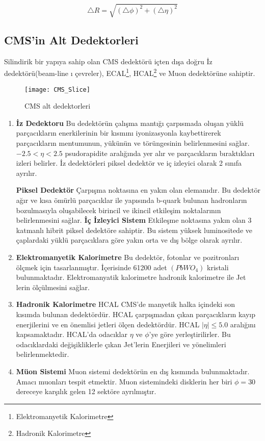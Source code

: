 \begin{equation}
\triangle R = \sqrt{(\triangle \phi)^2 + (\triangle  \eta)^2}
\label{eq:daltar}
\end{equation}


\subsection{CMS'in Alt Dedektorleri}

Silindirik bir yapıya sahip olan CMS dedektörü içten dışa doğru İz	dedektörü(beam-line ı çevreler), ECAL\footnote{Elektromanyetik Kalorimetre}, HCAL\footnote{Hadronik Kalorimetre} ve Muon dedektörüne sahiptir.
\begin{figure}[!htbp]
\begin{center}
\texttt{[image: CMS\_Slice]}
\caption{CMS alt dedektorleri}
\end{center}
\end{figure}
\begin{enumerate}


\item \textbf{İz Dedektoru}
Bu dedektörün çalışma mantığı çarpısmada oluşan yüklü parçacıkların enerkilerinin bir kısmını iyonizasyonla kaybettirerek parçacıkların mentumunun, yükünün ve törüngesinin belirlenmesini sağlar.$-2.5 < \eta < 2.5 $ psudorapidite aralığında yer alır ve parçacıkların bıraktıkları izleri belirler. İz dedektörleri piksel dedektör ve iç izleyici olarak 2 sınıfa ayrılır. 

\textbf{Piksel Dedektör}
Çarpışma noktasına en yakın olan elemanıdır. Bu dedektör ağır ve kısa ömürlü parçacıklar ile yapısında b-quark bulunan hadronların bozulmasıyla oluşabilecek birincil ve ikincil etkileşim noktalarının belirlenmesini sağlar.
\textbf{İç İzleyici Sistem}
Etkileşme noktasına yakın olan 3 katmanlı hibrit piksel dedektöre sahiptir. Bu sistem yüksek luminositede ve çaplardaki yüklü parçacıklara göre yakın orta ve dış bölge olarak ayrılır.
\item \textbf{Elektromanyetik Kalorimetre}
Bu dedektör, fotonlar ve pozitronları ölçmek için tasarlanmıştır. İçerisinde 61200 adet $(PbWO_4)$ kristali bulunmaktadır. Elektromanyatik kalorimetre hadronik kalorimetre ile Jet lerin ölçülmesini sağlar.
\item \textbf{Hadronik Kalorimetre}
HCAL CMS'de manyetik halka içindeki son kısımda bulunan dedektördür. HCAL çarpışmadan çıkan parçacıkların kayıp enerjilerini ve en önemlisi jetleri ölçen dedektördür. HCAL $|\eta| \leq 5.0 $ aralığını kapsamaktadır. HCAL'da odacıklar $\eta$ ve $\phi$'ye göre yerleştirilirler. Bu odacıklardaki değişikliklerle çıkan Jet'lerin Enerjileri ve yönelimleri belirlenmektedir.
\item \textbf{Müon Sistemi}
Muon sistemi dedektörün en dış kısmında bulunmaktadır. Amacı muonları tespit etmektir. Muon sistemindeki disklerin her biri $\phi = 30 $ dereceye karşılık gelen 12 sektöre ayrılmıştır. 
\end{enumerate}